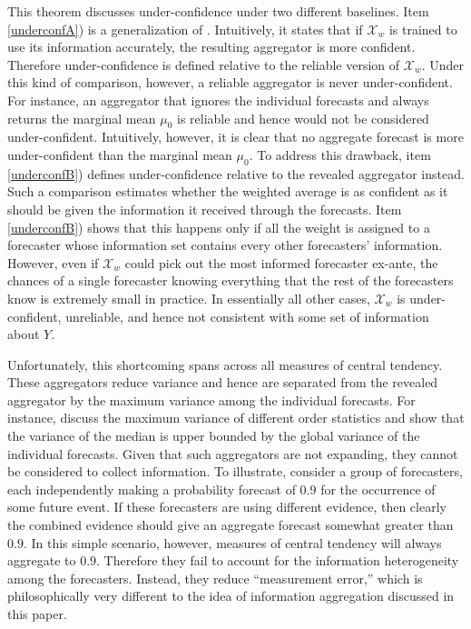 \documentclass[12pt]{article}
\theoremstyle{definition}
\theoremstyle{definition}
\begin{document}
This theorem discusses under-confidence under two different baselines. Item \ref{underconfA}) is a generalization of \citet[Theorem 2.1.]{Ranjan08}. Intuitively, it states that if $\mathcal{X}_w$ is trained to use its information accurately, the resulting aggregator is more confident. Therefore under-confidence is defined relative to the reliable version of  $\mathcal{X}_w$. Under this kind of comparison, however, a reliable aggregator is never under-confident. For instance, an aggregator that ignores the individual forecasts and always returns the marginal mean $\mu_0$ is reliable and hence would not be considered under-confident. Intuitively, however, it is clear that no aggregate forecast is more under-confident than the marginal mean $\mu_0$. To address this drawback, item \ref{underconfB}) defines under-confidence relative to  the revealed aggregator instead. Such a comparison estimates whether the weighted average is as confident as it should be given the information it received through the forecasts. Item \ref{underconfB}) shows that this happens only if all the weight is assigned to a forecaster whose information set contains every other forecasters' information. However, even if $\mathcal{X}_w$ could pick out the most informed forecaster ex-ante, the chances of a single forecaster knowing everything that the rest of the forecasters know is extremely small in practice. In essentially all other cases, $\mathcal{X}_w$ is under-confident, unreliable,  
and hence not consistent with some set of information about $Y$. 

Unfortunately, this shortcoming spans across all measures of central tendency. These aggregators reduce variance and hence are separated from the revealed aggregator by the maximum variance among the individual forecasts. For instance, \cite{papadatos1995maximum} discuss the maximum variance of different order statistics and show that the variance of the median is upper bounded by the global variance of the individual forecasts. Given that such aggregators are not expanding, they cannot be considered to collect information. To illustrate, consider a group of forecasters, each independently making a probability forecast of $0.9$ for the occurrence of some future event. If these forecasters are using different evidence, then clearly the combined evidence should give an aggregate forecast somewhat greater than $0.9$. In this simple scenario, however, measures of central tendency will always aggregate to $0.9$. Therefore they fail to account for the information heterogeneity among the forecasters. 
Instead, they reduce ``measurement error,'' which is philosophically very different to the idea of information aggregation discussed in this paper. 
\end{document}
